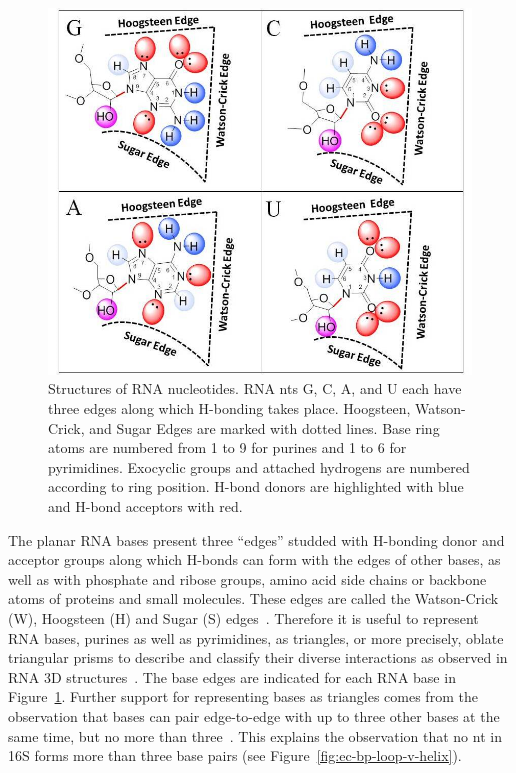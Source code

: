 \begin{figure}[p]
  \includegraphics[width=\linewidth]{chapter-1/figs/bases}
  \caption{Structures of RNA nucleotides. RNA nts G, C, A, and U each have three
    edges along which H-bonding takes place. Hoogsteen, Watson-Crick, and Sugar
    Edges are marked with dotted lines. Base ring atoms are numbered from 1 to 9
    for purines and 1 to 6 for pyrimidines. Exocyclic groups and attached
    hydrogens are numbered according to ring position. H-bond donors are
  highlighted with blue and H-bond acceptors with red.}
\label{fig:bases}
\end{figure}

The planar RNA bases present three ``edges'' studded with H-bonding donor and 
acceptor groups along which H-bonds can form with the edges of other bases, as
well as with phosphate and ribose groups, amino acid side chains or backbone
atoms of proteins and small molecules. These edges are called the Watson-Crick
(W), Hoogsteen (H) and Sugar (S) edges~\cite{Leontis2001}. Therefore it is
useful to represent RNA bases, purines as well as pyrimidines, as triangles, or
more precisely, oblate triangular prisms to describe and classify their diverse
interactions as observed in RNA 3D structures~\cite{Hoehndorf2011}. The base
edges are indicated for each RNA base in Figure~\ref{fig:bases}. Further support for
representing bases as triangles comes from the observation that bases can pair
edge-to-edge with up to three other bases at the same time, but no more than
three~\cite{AbuAlmakarem2012b}. This explains the observation that no nt in 16S
forms more than three base pairs (see Figure~\ref{fig:ec-bp-loop-v-helix}). 

